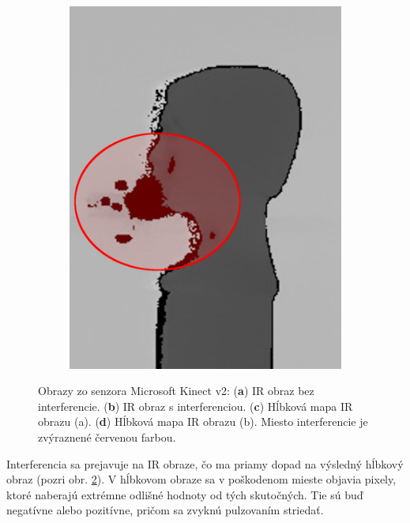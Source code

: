 \begin{figure}[h]
\begin{subfigure}[b]{0.2\textwidth}
		\includegraphics[width=\textwidth]{figures/depth_ir-d.png}
		\caption{}
		\label{fig:depthir:d}
	\end{subfigure}
	\caption{Obrazy zo senzora Microsoft Kinect v2: (\textbf{a}) IR obraz bez interferencie. (\textbf{b}) IR obraz s interferenciou. (\textbf{c}) Hĺbková mapa IR obrazu (a). (\textbf{d}) Hĺbková mapa IR obrazu (b). Miesto interferencie je zvýraznené červenou farbou.}
	\label{fig:depthir}
\end{figure}

Interferencia sa prejavuje na IR obraze, čo ma priamy dopad na výsledný hĺbkový obraz (pozri obr. \ref{fig:depthir}). V hĺbkovom obraze sa v poškodenom mieste objavia pixely, ktoré naberajú extrémne odlišné hodnoty od tých skutočných. Tie sú buď negatívne alebo pozitívne, pričom sa zvyknú pulzovaním striedať. 

